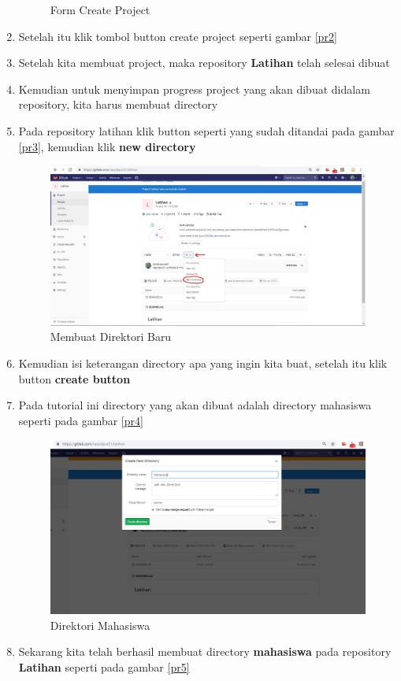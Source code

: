 \begin{enumerate}
\begin{figure}[!htbp]
\caption{Form Create Project}
\label{fig:pr2}
\end{figure}
\item Setelah itu klik tombol button create project seperti gambar \ref{pr2}
\item Setelah kita membuat project, maka repository \textbf{Latihan} telah selesai dibuat
\item Kemudian untuk menyimpan progress project yang akan dibuat didalam repository, kita harus membuat directory 
\item Pada repository latihan klik button seperti yang sudah ditandai pada gambar \ref{pr3}, kemudian klik \textbf{new directory}  
\subitem
\begin{figure}[!htbp]
\centerline{\includegraphics[width=.75\textwidth]{Figures/gitlab/pr3.JPG}}
\caption{Membuat Direktori Baru}
\label{fig:pr3}
\end{figure}
\item Kemudian isi keterangan directory apa yang ingin kita buat, setelah itu klik button \textbf{create button}
\item Pada tutorial ini directory yang akan dibuat adalah directory mahasiswa seperti pada gambar \ref{pr4}
\subitem
\begin{figure}[!htbp]
\centerline{\includegraphics[width=.75\textwidth]{Figures/gitlab/pr4.JPG}}
\caption{Direktori Mahasiswa}
\label{fig:pr4}
\end{figure}
\item Sekarang kita telah berhasil membuat directory \textbf{mahasiswa} pada repository \textbf{Latihan} seperti pada gambar \ref{pr5}

\end{enumerate}
